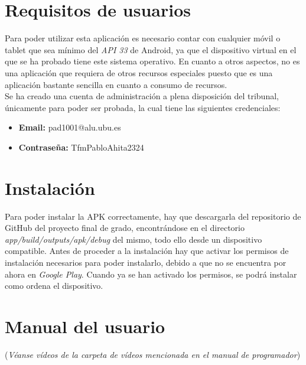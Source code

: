 
\section{Requisitos de usuarios}

Para poder utilizar esta aplicación es necesario contar con cualquier móvil o
tablet que sea mínimo del \textit{API 33} de Android, ya que el dispositivo
virtual en el que se ha probado tiene este sistema operativo. En cuanto a otros
aspectos, no es una aplicación que requiera de otros recursos especiales puesto
que es una aplicación bastante sencilla en cuanto a consumo de recursos.
\\
Se ha creado una cuenta de administración a plena disposición del tribunal,
únicamente para poder ser probada, la cual tiene las siguientes credenciales:
\begin{itemize}
    \item \textbf{Email: }pad1001@alu.ubu.es
    \item \textbf{Contraseña: }TfmPabloAhita2324
\end{itemize}

\section{Instalación}
Para poder instalar la APK correctamente, hay que descargarla del repositorio de
GitHub del proyecto final de grado, encontrándose en el directorio
\textit{app/build/outputs/apk/debug} del mismo, todo ello desde un dispositivo
compatible. Antes de proceder a la instalación hay que activar los permisos de
instalación necesarios para poder instalarlo, debido a que no se encuentra por
ahora en \textit{Google Play}. Cuando ya se han activado los permisos, se podrá
instalar como ordena el dispositivo. 

\section{Manual del usuario}
(\textit{Véanse vídeos de la carpeta de vídeos mencionada en el manual de programador})

